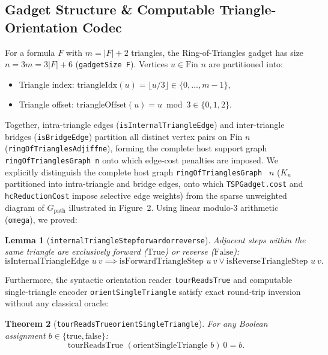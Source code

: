 \documentclass[11pt,a4paper]{article}
\renewcommand{\_}{\origunderscore\allowbreak}
\theoremstyle{plain}
\newtheorem{theorem}{Theorem}[section]
\newtheorem{lemma}[theorem]{Lemma}
\theoremstyle{definition}
\theoremstyle{remark}
\begin{document}
\subsection{Gadget Structure \& Computable Triangle-Orientation Codec}
For a formula $F$ with $m = |F| + 2$ triangles, the Ring-of-Triangles gadget has size $n = 3m = 3|F| + 6$ (\texttt{gadgetSize F}). Vertices $u \in \text{Fin } n$ are partitioned into:
\begin{itemize}
  \item Triangle index: $\text{triangleIdx}(u) = \lfloor u / 3 \rfloor \in \{0, \dots, m-1\}$,
  \item Triangle offset: $\text{triangleOffset}(u) = u \bmod 3 \in \{0, 1, 2\}$.
\end{itemize}
Together, intra-triangle edges (\texttt{isInternalTriangleEdge}) and inter-triangle bridges (\texttt{isBridgeEdge}) partition all distinct vertex pairs on $\text{Fin } n$ (\texttt{ringOfTrianglesAdj\_iff\_ne}), forming the complete host support graph \texttt{ringOfTrianglesGraph n} onto which edge-cost penalties are imposed. We explicitly distinguish the complete host graph \texttt{ringOfTrianglesGraph } $n$ ($K_n$ partitioned into intra-triangle and bridge edges, onto which \texttt{TSPGadget.cost} and \texttt{hcReductionCost} impose selective edge weights) from the sparse unweighted diagram of $G_{\text{path}}$ illustrated in Figure~2. Using linear modulo-3 arithmetic (\texttt{omega}), we proved:
\begin{lemma}[\texttt{internalTriangleStep\_forward\_or\_reverse}]
Adjacent steps within the same triangle are exclusively forward ($\text{True}$) or reverse ($\text{False}$):
\begin{equation*}
  \text{isInternalTriangleEdge } u\ v \implies \text{isForwardTriangleStep } u\ v \lor \text{isReverseTriangleStep } u\ v.
\end{equation*}
\end{lemma}
Furthermore, the syntactic orientation reader \texttt{tourReadsTrue} and computable single-triangle encoder \texttt{orient\allowbreak Single\allowbreak Triangle} satisfy exact round-trip inversion without any classical oracle:
\begin{theorem}[\texttt{tourReadsTrue\_orientSingleTriangle}]
For any Boolean assignment $b \in \{\text{true}, \text{false}\}$:
\begin{equation*}
  \text{tourReadsTrue }(\text{orientSingleTriangle } b)\ 0 = b.
\end{equation*}
\end{theorem}
\end{document}
